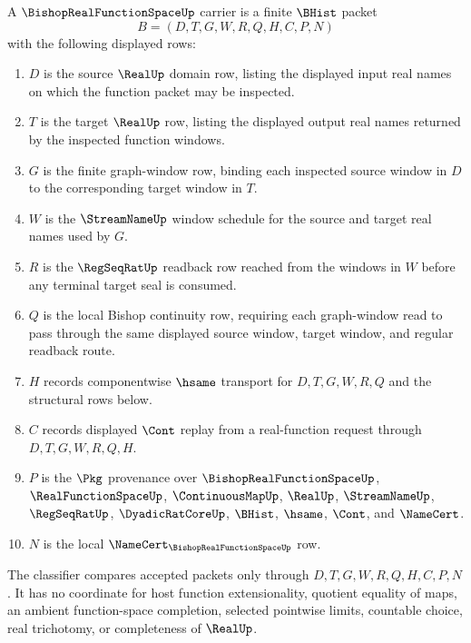 \begin{definition}\label{def:bishop-real-function-space-carrier}
A $\BishopRealFunctionSpaceUp$ carrier is a finite $\BHist$ packet
$$
B=(D,T,G,W,R,Q,H,C,P,N)
$$
with the following displayed rows:
\begin{enumerate}
\item $D$ is the source $\RealUp$ domain row, listing the displayed input real names on which the function packet may be inspected.
\item $T$ is the target $\RealUp$ row, listing the displayed output real names returned by the inspected function windows.
\item $G$ is the finite graph-window row, binding each inspected source window in $D$ to the corresponding target window in $T$.
\item $W$ is the $\StreamNameUp$ window schedule for the source and target real names used by $G$.
\item $R$ is the $\RegSeqRatUp$ readback row reached from the windows in $W$ before any terminal target seal is consumed.
\item $Q$ is the local Bishop continuity row, requiring each graph-window read to pass through the same displayed source window, target window, and regular readback route.
\item $H$ records componentwise $\hsame$ transport for $D,T,G,W,R,Q$ and the structural rows below.
\item $C$ records displayed $\Cont$ replay from a real-function request through $D,T,G,W,R,Q,H$.
\item $P$ is the $\Pkg$ provenance over $\BishopRealFunctionSpaceUp$, $\RealFunctionSpaceUp$, $\ContinuousMapUp$, $\RealUp$, $\StreamNameUp$, $\RegSeqRatUp$, $\DyadicRatCoreUp$, $\BHist$, $\hsame$, $\Cont$, and $\NameCert$.
\item $N$ is the local $\NameCert_{\BishopRealFunctionSpaceUp}$ row.
\end{enumerate}
The classifier compares accepted packets only through $D,T,G,W,R,Q,H,C,P,N$. It has no coordinate for host function extensionality, quotient equality of maps, an ambient function-space completion, selected pointwise limits, countable choice, real trichotomy, or completeness of $\RealUp$.
\end{definition}

